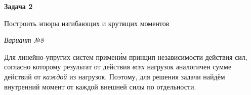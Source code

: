 \documentclass[14pt]{extarticle}
\begin{document}
\begin{center}
\textbf{Задача 2\raisebox{.7ex}{\small я}}
\vspace{.4cm}

Построить эпюры изгибающих и крутящих моментов
\vspace{1cm}

\emph{Вариант №\hspace{.33ex}8}
\vspace{.8cm}

\end{center}

\vspace{2cm}

Для линейно-упругих систем примен\'{и}м принцип независимости действия сил, согласно которому
результат от действия \emph{всех} нагрузок аналогичен сумме действий от \emph{каждой} из нагрузок.
Поэтому, для решения задачи найдём внутренний момент от каждой внешней силы по отдельности.
\end{document}
